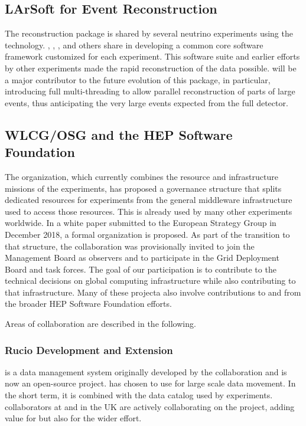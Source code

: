 \subsection{LArSoft for Event Reconstruction}

The \cite{Snider:2017wjd} reconstruction package is shared by several neutrino experiments using the  technology.  , , , and others share in developing a common core software framework customized for each experiment. This software suite and earlier efforts by other experiments made the rapid reconstruction of the  data possible.   will be a major contributor to  the future evolution of this package, in particular, introducing full multi-threading to allow parallel reconstruction of parts of large events, thus anticipating the very large events expected from the full detector. 

\subsection{WLCG/OSG and the HEP Software Foundation}
The  \cite{Bird:2014ctt} organization, which currently combines the resource and infrastructure missions of the  experiments, has proposed a governance structure that splits dedicated resources for  experiments from the general middleware infrastructure used to access those resources.  This  is already used by many other experiments worldwide.  In a white paper submitted to the European Strategy Group in December 2018\cite{bib:BirdEUStrategy}, a formal  organization is proposed. As part of the transition to that structure, the  collaboration was provisionally invited to join the  Management Board as observers and to participate in the Grid Deployment Board and task forces. The goal of our participation is to contribute to the technical decisions on global computing infrastructure while also contributing to that infrastructure. 
Many of these projecta also involve contributions to and from the broader HEP Software Foundation efforts. 

Areas of collaboration are described in the following. 

\subsubsection{Rucio Development and Extension}

 \cite{Barisits:2019fyl}
is a data management system originally developed by the  collaboration and is now an open-source project.   has chosen to use  for large scale data movement.  In the short term, it is combined with the  data catalog used by  experiments.   collaborators at  and in the UK are actively collaborating on the  project, adding value for  but also for the wider effort.


